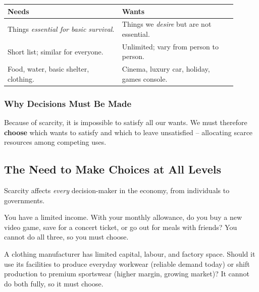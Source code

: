 \documentclass[11pt, a4paper, twoside]{book}
\begin{document}
\begin{tcolorbox}[
  enhanced, colback=LightBlue, colframe=NavyPrimary,
  arc=0pt, boxrule=0.7pt,
  left=8pt, right=8pt, top=6pt, bottom=6pt
]
\begin{tabular}{@{}>{\RaggedRight\arraybackslash}p{0.45\linewidth}>{\RaggedRight\arraybackslash}p{0.45\linewidth}@{}}
\textbf{\color{NavyPrimary}Needs} & \textbf{\color{NavyPrimary}Wants} \\
\midrule
Things \emph{essential for basic survival}. & Things we \emph{desire} but are not essential. \\
Short list; similar for everyone. & Unlimited; vary from person to person. \\
Food, water, basic shelter, clothing. & Cinema, luxury car, holiday, games console.
\end{tabular}
\end{tcolorbox}

\subsubsection{Why Decisions Must Be Made}

Because of scarcity, it is impossible to satisfy all our wants. We must therefore \textbf{choose} which wants to satisfy and which to leave unsatisfied -- allocating scarce resources among competing uses.

\subsection{The Need to Make Choices at All Levels}

Scarcity affects \emph{every} decision-maker in the economy, from individuals to governments.

\begin{example}
You have a limited income. With your monthly allowance, do you buy a new video game, save for a concert ticket, or go out for meals with friends? You cannot do all three, so you must choose.
\end{example}

\begin{example}[Firms]
A clothing manufacturer has limited capital, labour, and factory space. Should it use its facilities to produce everyday workwear (reliable demand today) or shift production to premium sportswear (higher margin, growing market)? It cannot do both fully, so it must choose.
\end{example}
\end{document}
